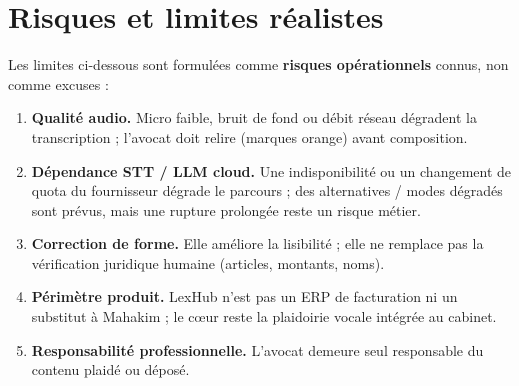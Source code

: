 \section{Risques et limites réalistes}
\label{sec:limites}

Les limites ci-dessous sont formulées comme \textbf{risques opérationnels} connus, non comme excuses :

\begin{enumerate}[leftmargin=1.4em]
  \item \textbf{Qualité audio.} Micro faible, bruit de fond ou débit réseau dégradent la transcription ; l'avocat doit relire (marques orange) avant composition.
  \item \textbf{Dépendance STT / LLM cloud.} Une indisponibilité ou un changement de quota du fournisseur dégrade le parcours ; des alternatives / modes dégradés sont prévus, mais une rupture prolongée reste un risque métier.
  \item \textbf{Correction de forme.} Elle améliore la lisibilité ; elle ne remplace pas la vérification juridique humaine (articles, montants, noms).
  \item \textbf{Périmètre produit.} LexHub n'est pas un ERP de facturation ni un substitut à Mahakim ; le cœur reste la plaidoirie vocale intégrée au cabinet.
  \item \textbf{Responsabilité professionnelle.} L'avocat demeure seul responsable du contenu plaidé ou déposé.
\end{enumerate}
